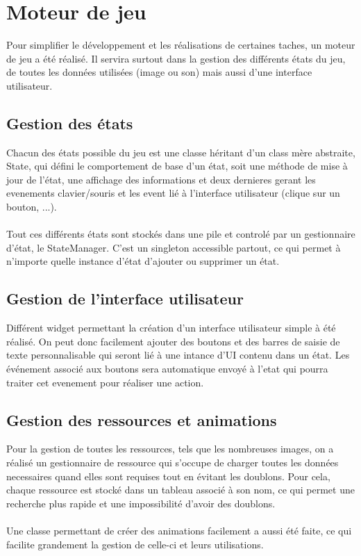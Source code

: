 \documentclass[a4paper]{memoir}
\begin{document}
		\section{Moteur de jeu}
			Pour simplifier le développement et les réalisations de certaines taches, un moteur de jeu a été réalisé. Il servira surtout dans la gestion des différents états du jeu, de toutes les données utilisées (image ou son) mais aussi d'une interface utilisateur.
		
			\subsection{Gestion des états}
				Chacun des états possible du jeu est une classe héritant d'un class mère abstraite, State, qui défini le comportement de base d'un état, soit une méthode de mise à jour de l'état, une affichage des informations et deux dernieres gerant les evenements clavier/souris et les event lié à l'interface utilisateur (clique sur un bouton, ...).\\
				\\
				Tout ces différents états sont stockés dans une pile et controlé par un gestionnaire d'état, le StateManager. C'est un singleton accessible partout, ce qui permet à n'importe quelle instance d'état d'ajouter ou supprimer un état.
			
			\subsection{Gestion de l'interface utilisateur}
				Différent widget permettant la création d'un interface utilisateur simple à été réalisé. On peut donc facilement ajouter des boutons et des barres de saisie de texte personnalisable qui seront lié à une intance d'UI contenu dans un état. Les événement associé aux boutons sera automatique envoyé à l'etat qui pourra traiter cet evenement pour réaliser une action.
			
			\subsection{Gestion des ressources et animations}
				Pour la gestion de toutes les ressources, tels que les nombreuses images, on a réalisé un gestionnaire de ressource qui s'occupe de charger toutes les données necessaires quand elles sont requises tout en évitant les doublons. Pour cela, chaque ressource est stocké dans un tableau associé à son nom, ce qui permet une recherche plus rapide et une impossibilité d'avoir des doublons.\\
				\\
				Une classe permettant de créer des animations facilement a aussi été faite, ce qui facilite grandement la gestion de celle-ci et leurs utilisations.
				
\end{document}
